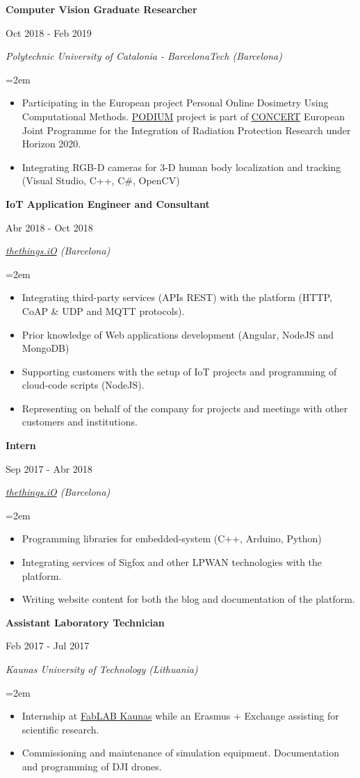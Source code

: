 \documentclass[10pt,a4paper,oneside]{book}
\newcommand{\sepspace}{\vspace*{0pt}}		%
\newcommand{\EducationEntrya}[4]{\noindent\ignorespaces	
		\begin{minipage}[t][][b]{0.8\textwidth} \raggedright{\textbf{#1}} \end{minipage} \hfill 
		\begin{minipage}[t][][b]{0.2\textwidth} \hfill\color{Black}#2 \end{minipage} 
		 
		\noindent \textit{#3} \par        %
		\noindent\hangindent=2em\hangafter=0 \small #4 
		\normalsize \par}
\begin{document}
\EducationEntrya{Computer Vision Graduate Researcher}{Oct 2018 - Feb 2019}{Polytechnic University of Catalonia - BarcelonaTech (Barcelona)}{\begin{itemize} 
\item Participating in the European project Personal Online Dosimetry Using Computational Methods. \href{https://podium-concerth2020.eu}{PODIUM} project is part of \href{http://www.concert-h2020.eu/}{CONCERT} European Joint Programme for the Integration of Radiation Protection Research under Horizon 2020.
\item Integrating RGB-D cameras for 3-D human body localization and tracking (Visual Studio, C++, C\#, OpenCV)
\end{itemize}}
\sepspace

\EducationEntrya{IoT Application Engineer and Consultant}{Abr 2018 - Oct 2018}{\href{https://thethings.io/}{thethings.iO} (Barcelona)}{\begin{itemize} 
\item Integrating third-party services (APIs REST) with the platform (HTTP, CoAP \& UDP and MQTT protocols).
\item Prior knowledge of Web applications development (Angular, NodeJS and MongoDB)
\item Supporting customers with the setup of IoT projects and programming of cloud-code scripts (NodeJS).
\item Representing on behalf of the company for projects and meetings with other customers and institutions.
\end{itemize}}
\sepspace

\EducationEntrya{Intern}{Sep 2017 - Abr 2018}{\href{https://thethings.io/}{thethings.iO} (Barcelona)}{\begin{itemize}
\item Programming libraries for embedded-system (C++, Arduino, Python)
\item Integrating services of Sigfox and other LPWAN technologies with the platform.
\item Writing website content for both the blog and  documentation of the platform. 
\end{itemize}}
\sepspace

\EducationEntrya{Assistant Laboratory Technician}{Feb 2017 - Jul 2017}{Kaunas University of Technology (Lithuania)}{\begin{itemize} 
\item Internship at \href{https://fablabkaunas.lt/}{FabLAB Kaunas} while an Erasmus + Exchange assisting for scientific research. 
\item Commissioning and maintenance of simulation equipment.  Documentation and programming of DJI drones.
\end{itemize}}
\sepspace
\end{document}
